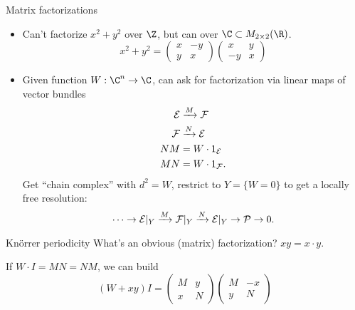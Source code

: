 \documentclass[10pt]{beamer}
\begin{document}
\begin{frame}{Matrix factorizations}
    \begin{itemize}
        \item Can't factorize $x^2+y^2$ over $\Z$, but can over
            $\C\subset M_{2\times2}(\R)$.
            \begin{equation*}
                x^2 + y^2 = \begin{pmatrix}
                    x & -y \\ y & x
                \end{pmatrix}\begin{pmatrix}
                    x & y \\ -y & x
                \end{pmatrix}
            \end{equation*}
        \item Given function $W:\C^n\to\C$, can ask for factorization via linear
            maps of vector bundles
            \begin{align*}
                \mathcal{E} &\xrightarrow{M} \mathcal{F} \\
                \mathcal{F} &\xrightarrow{N} \mathcal{E} \\
                NM &= W\cdot1_{\mathcal{E}} \\
                MN &= W\cdot1_{\mathcal{F}}.
            \end{align*}
            Get ``chain complex'' with $d^2=W$, restrict to $Y=\{W=0\}$ to get
            a locally free resolution:
            \begin{equation*}
                \cdots \to \mathcal{E}|_Y
                    \xrightarrow{M} \mathcal{F}|_Y
                    \xrightarrow{N} \mathcal{E}|_Y \to \mathcal{P} \to 0.
            \end{equation*}
    \end{itemize}
\end{frame}

\begin{frame}{Kn\"orrer periodicity}
    What's an obvious (matrix) factorization? \pause $xy = x\cdot y$.

    If $W\cdot I=MN=NM$, we can build
    \begin{equation*}
        (W+xy)I = \begin{pmatrix}
            M & y \\ x & N
        \end{pmatrix}\begin{pmatrix}
            M & -x \\ y & N
        \end{pmatrix} %
    \end{equation*}
\end{frame}
\end{document}
